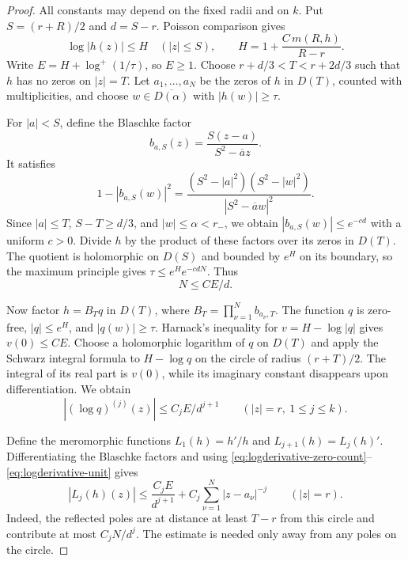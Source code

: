 \documentclass[12pt,letterpaper,reqno]{amsart}
\theoremstyle{definition}
\numberwithin{equation}{section}
\begin{document}
	\begin{proof}
		All constants may depend on the fixed radii and on $k$.
		Put $S=(r+R)/2$ and $d=S-r$. Poisson comparison gives
		\[
		\log|h(z)|\le H\quad(|z|\le S),\qquad
		H=1+\frac{C\,m(R,h)}{R-r}.
		\]
		Write $E=H+\log^+(1/\tau)$, so $E\ge1$. Choose
		$r+d/3<T<r+2d/3$ such that $h$ has no zeros on $|z|=T$.
		Let $a_1,\ldots,a_N$ be the zeros of $h$ in $D(T)$, counted with
		multiplicities, and choose $w\in\overline{D(\alpha)}$ with
		$|h(w)|\ge\tau$.
		
		For $|a|<S$, define the Blaschke factor
		\[
		b_{a,S}(z)=\frac{S(z-a)}{S^2-\overline a z}.
		\]
		It satisfies
		\[
		1-|b_{a,S}(w)|^2
		=\frac{(S^2-|a|^2)(S^2-|w|^2)}{|S^2-\overline a w|^2}.
		\]
		Since $|a|\le T$, $S-T\ge d/3$, and $|w|\le\alpha<r_-$,
		we obtain $|b_{a,S}(w)|\le e^{-cd}$ with a uniform $c>0$.
		Divide $h$ by the product of these factors over its zeros in $D(T)$.
		The quotient is holomorphic on $D(S)$ and bounded by $e^H$ on its
		boundary, so the maximum principle gives
		$\tau\le e^He^{-cdN}$. Thus
		\begin{equation}\label{eq:logderivative-zero-count}
			N\le CE/d.
		\end{equation}
		
		Now factor $h=B_Tq$ in $D(T)$, where
		$B_T=\prod_{\nu=1}^N b_{a_\nu,T}$.
		The function $q$ is zero-free, $|q|\le e^H$, and $|q(w)|\ge\tau$.
		Harnack's inequality for $v=H-\log|q|$ gives $v(0)\le CE$.
		Choose a holomorphic logarithm of $q$ on $D(T)$ and apply the
		Schwarz integral formula to $H-\log q$ on the circle of radius
		$(r+T)/2$. The integral of its real part is $v(0)$, while its
		imaginary constant disappears upon differentiation. We obtain
		\begin{equation}\label{eq:logderivative-unit}
			|(\log q)^{(j)}(z)|\le C_jE/d^{j+1}
			\qquad(|z|=r,\ 1\le j\le k).
		\end{equation}
		
		Define the meromorphic functions $L_1(h)=h'/h$ and
		$L_{j+1}(h)=L_j(h)'$.
		Differentiating the Blaschke factors and using
		\eqref{eq:logderivative-zero-count}--\eqref{eq:logderivative-unit}
		gives
		\begin{equation}\label{eq:logderivative-poles}
			|L_j(h)(z)|\le\frac{C_jE}{d^{j+1}}
			+C_j\sum_{\nu=1}^N|z-a_\nu|^{-j}
			\qquad(|z|=r).
		\end{equation}
		Indeed, the reflected poles are at distance at least $T-r$ from
		this circle and contribute at most $C_jN/d^j$.
		The estimate is needed only away from any poles on the circle.
		

\end{proof}
\end{document}
